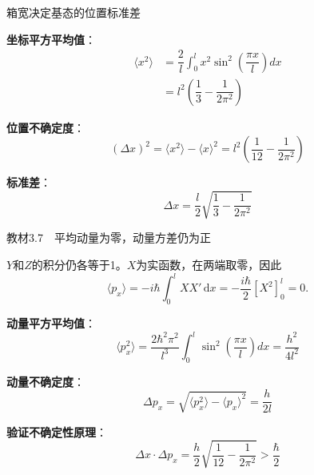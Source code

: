 \begin{frame}{箱宽决定基态的位置标准差}

  \begin{iqbitemize}
    \item \textbf{坐标平方平均值}：
    \begin{align*}
      \langle x^2 \rangle &= \dfrac{2}{l}\int_0^l x^2\sin^2\left(\dfrac{\pi x}{l}\right)dx \\
      &= l^2\left(\dfrac{1}{3} - \dfrac{1}{2\pi^2}\right)
    \end{align*}

    \item \textbf{位置不确定度}：
    \[
      (\Delta x)^2 = \langle x^2 \rangle - \langle x \rangle^2 = l^2\left(\dfrac{1}{12} - \dfrac{1}{2\pi^2}\right)
    \]

    \item \textbf{标准差}：
    \[
      \Delta x = \dfrac{l}{2}\sqrt{\dfrac{1}{3} - \dfrac{1}{2\pi^2}}
    \]
  \end{iqbitemize}

\end{frame}

\begin{frame}{教材3.7　平均动量为零，动量方差仍为正}

  \begin{iqbitemize}
    \item $Y$和$Z$的积分仍各等于1。$X$为实函数，在两端取零，因此
    \[
      \langle p_x\rangle=-i\hbar\int_0^l XX'\,\mathrm{d}x
        =-\dfrac{i\hbar}{2}[X^2]_0^l=0 .
    \]

    \item \textbf{动量平方平均值}：
    \[
      \langle p_x^2 \rangle = \dfrac{2\hbar^2\pi^2}{l^3}\int_0^l \sin^2\left(\dfrac{\pi x}{l}\right)dx = \dfrac{h^2}{4l^2}
    \]

    \item \textbf{动量不确定度}：
    \[
      \Delta p_x = \sqrt{\langle p_x^2 \rangle - \langle p_x \rangle^2} = \dfrac{h}{2l}
    \]

    \item \textbf{验证不确定性原理}：
    \[
      \Delta x \cdot \Delta p_x = \dfrac{h}{2}\sqrt{\dfrac{1}{12} - \dfrac{1}{2\pi^2}} > \dfrac{\hbar}{2}
    \]
  \end{iqbitemize}

\end{frame}

